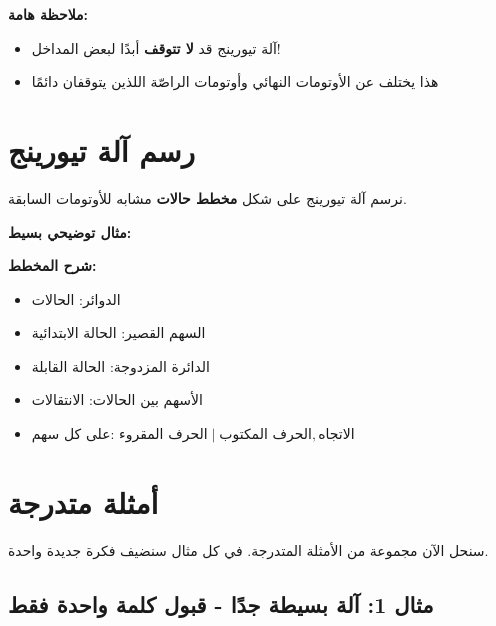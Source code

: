 \documentclass[14pt]{extarticle}
\begin{document}
\begin{boxNote}
\textbf{ملاحظة هامة:}
\begin{itemize}
    \item آلة تيورينج قد \textbf{لا تتوقف} أبدًا لبعض المداخل!
    \item هذا يختلف عن الأوتومات النهائي وأوتومات الراصّة اللذين يتوقفان دائمًا
\end{itemize}
\end{boxNote}

\clearpage

\section{رسم آلة تيورينج}

نرسم آلة تيورينج على شكل \textbf{مخطط حالات} مشابه للأوتومات السابقة.

\textbf{مثال توضيحي بسيط:}

\begin{center}
\end{center}

\textbf{شرح المخطط:}
\begin{itemize}
    \item الدوائر: الحالات
    \item السهم القصير: الحالة الابتدائية
    \item الدائرة المزدوجة: الحالة القابلة
    \item الأسهم بين الحالات: الانتقالات
    \item على كل سهم: $\text{الحرف المقروء} \mid \text{الحرف المكتوب}, \text{الاتجاه}$
\end{itemize}

\clearpage

\section{أمثلة متدرجة}

سنحل الآن مجموعة من الأمثلة المتدرجة. في كل مثال سنضيف فكرة جديدة واحدة.

\subsection{مثال 1: آلة بسيطة جدًا - قبول كلمة واحدة فقط}
\end{document}
